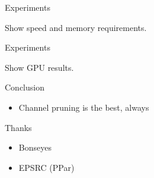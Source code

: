 \documentclass[xcolor=dvipsnames]{beamer}
\begin{document}
\begin{frame}{Experiments}
    
    Show speed and memory requirements.
    
\end{frame}



\begin{frame}{Experiments}
    
    Show GPU results.

    
\end{frame}








\begin{frame}{Conclusion}
    
    \begin{itemize}
        \item Channel pruning is the best, always
    \end{itemize}
    
\end{frame}


\begin{frame}{Thanks}
    \begin{itemize}
        \item Bonseyes
        \item EPSRC (PPar)
    \end{itemize}
\end{frame}
\end{document}
